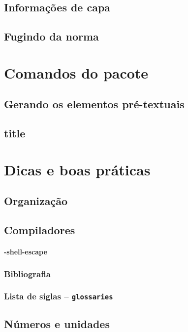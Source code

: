 \documentclass[openright,draft]{memoir}
\begin{document}
\section{Informações de capa}
\section{Fugindo da norma}

\chapter{Comandos do pacote}
\section{Gerando os elementos pré-textuais}
\section{title}
\chapter{Dicas e boas práticas}
\section{Organização}
\section{Compiladores}
\subsubsection{-shell-escape}
\subsection{Bibliografia}
\subsection{Lista de siglas -- \texttt{glossaries}}
\section{Números e unidades}
\end{document}
